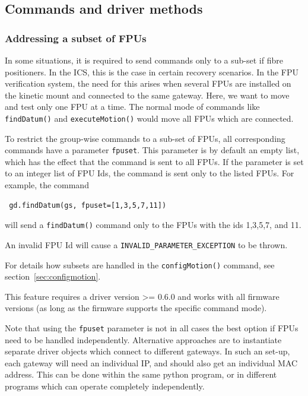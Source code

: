 \documentclass[11pt,a4paper]{scrartcl}
\begin{document}
\subsection{Commands and driver methods}
\label{sec:commands}

\subsubsection{Addressing a subset of FPUs}
\label{sec:subsets}
 In some situations, it is required
to send commands only to a sub-set if fibre positioners. In the ICS,
this is the case in certain recovery scenarios.  In the FPU
verification system, the need for this arises when several FPUs are
installed on the kinetic mount and connected to the same
gateway. Here, we want to move and test only one FPU at a time. The
normal mode of commands like \texttt{findDatum()} and
\texttt{executeMotion()} would move all FPUs which are connected.

To restrict the group-wise commands to a sub-set of FPUs, all
corresponding commands have a parameter \texttt{fpuset}.  This
parameter is by default an empty list, which has the effect that the
command is sent to all FPUs. If the parameter is set to an integer
list of FPU Ids, the command is sent only to the listed FPUs.
For example, the command

\begin{verbatim}
 gd.findDatum(gs, fpuset=[1,3,5,7,11])
\end{verbatim}
will send a \texttt{findDatum()} command only to the FPUs with the ids
1,3,5,7, and 11.

An invalid FPU Id will cause a \texttt{INVALID\_PARAMETER\_EXCEPTION}
to be thrown.

For details how subsets are handled in the \texttt{configMotion()}
command, see section~\ref{sec:configmotion}.

This feature requires a driver version >= 0.6.0 and works with all
firmware versions (as long as the firmware supports the specific
command mode).

Note that using the \texttt{fpuset} parameter is not in all cases the
best option if FPUs need to be handled independently. Alternative
approaches are to instantiate separate driver objects which connect to
different gateways. In such an set-up, each gateway will need an
individual IP, and should also get an individual MAC address. This can
be done within the same python program, or in different programs which
can operate completely independently.
\end{document}
